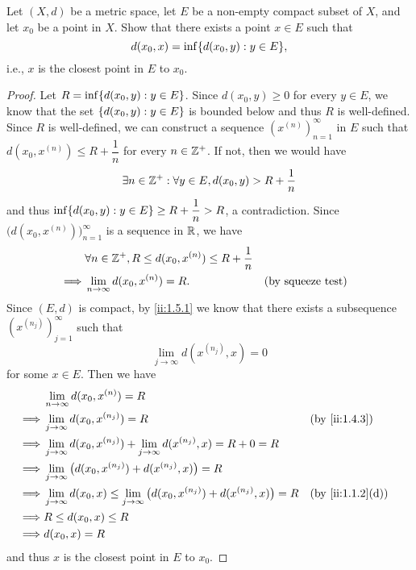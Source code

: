 \begin{ex}\label{ii:ex:1.5.14}
  Let \((X, d)\) be a metric space, let \(E\) be a non-empty compact subset of \(X\), and let \(x_0\) be a point in \(X\).
  Show that there exists a point \(x \in E\) such that
  \[
    d(x_0, x) = \inf\set{d(x_0, y) : y \in E},
  \]
  i.e., \(x\) is the closest point in \(E\) to \(x_0\).
\end{ex}

\begin{proof}
  Let \(R = \inf\set{d(x_0, y) : y \in E}\).
  Since \(d(x_0, y) \geq 0\) for every \(y \in E\), we know that the set \(\left\lbrace d(x_0, y) : y \in E\right\rbrace\) is bounded below and thus \(R\) is well-defined.
  Since \(R\) is well-defined, we can construct a sequence \((x^{(n)})_{n = 1}^\infty\) in \(E\) such that \(d(x_0, x^{(n)}) \leq R + \dfrac{1}{n}\) for every \(n \in \mathbb{Z}^+\).
  If not, then we would have
  \[
    \exists n \in \mathbb{Z}^+ : \forall y \in E, d(x_0, y) > R + \dfrac{1}{n}
  \]
  and thus \(\inf\set{d(x_0, y) : y \in E} \geq R + \dfrac{1}{n} > R\), a contradiction.
  Since \(\big(d(x_0, x^{(n)})\big)_{n = 1}^\infty\) is a sequence in \(\mathbb{R}\), we have
  \begin{align*}
             & \forall n \in \mathbb{Z}^+, R \leq d(x_0, x^{(n)}) \leq R + \dfrac{1}{n}                               \\
    \implies & \lim_{n \to \infty} d(x_0, x^{(n)}) = R.                         &  & \text{(by squeeze test)}
  \end{align*}
  Since \((E, d)\) is compact, by \cref{ii:1.5.1} we know that there exists a subsequence \((x^{(n_j)})_{j = 1}^\infty\) such that
  \[
    \lim_{j \to \infty} d(x^{(n_j)}, x) = 0
  \]
  for some \(x \in E\).
  Then we have
  \begin{align*}
             & \lim_{n \to \infty} d(x_0, x^{(n)}) = R                                                                                        \\
    \implies & \lim_{j \to \infty} d(x_0, x^{(n_j)}) = R                                                                &  & \by{ii:1.4.3}    \\
    \implies & \lim_{j \to \infty} d(x_0, x^{(n_j)}) + \lim_{j \to \infty} d(x^{(n_j)}, x) = R + 0 = R                                        \\
    \implies & \lim_{j \to \infty} \big(d(x_0, x^{(n_j)}) + d(x^{(n_j)}, x)\big) = R                                                          \\
    \implies & \lim_{j \to \infty} d(x_0, x) \leq \lim_{j \to \infty} \big(d(x_0, x^{(n_j)}) + d(x^{(n_j)}, x)\big) = R &  & \by{ii:1.1.2}[d] \\
    \implies & R \leq d(x_0, x) \leq R                                                                                                        \\
    \implies & d(x_0, x) = R
  \end{align*}
  and thus \(x\) is the closest point in \(E\) to \(x_0\).
\end{proof}

